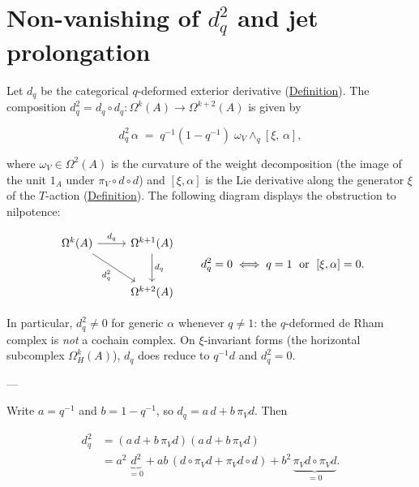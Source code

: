 \section{Non-vanishing of $d_q^2$ and jet prolongation}
\label{sec:dq-squared}

\begin{proposition}
  \label{prop:categorical-dq-squared}
Let $d_q$ be the categorical $q$-deformed exterior derivative
(\hyperref[def:categorical-q-ext-deriv]{Definition}).  The composition
$d_q^2 = d_q \circ d_q \colon \Omega^k(A) \to \Omega^{k+2}(A)$ is
given by

\[
d_q^2\,\alpha
  \;=\; q^{-1}(1 - q^{-1})\;\omega_V \wedge_q [\xi,\, \alpha],
\]

where $\omega_V \in \Omega^2(A)$ is the curvature of the weight
decomposition (the image of the unit $1_A$ under
$\pi_V \circ d \circ d$) and $[\xi, \alpha]$ is the Lie derivative
along the generator $\xi$ of the $T$-action
(\hyperref[def:weight-decomposition]{Definition}).  The following diagram
displays the obstruction to nilpotence:

\begin{equation}\label{eq:dq-squared-cd}
\begin{tikzcd}[row sep=2.5em, column sep=2.5em]
  \Omega^k(A) \ar[r, "d_q"] \ar[dr, "d_q^2"']
  & \Omega^{k+1}(A) \ar[d, "d_q"] \\
  & \Omega^{k+2}(A)
\end{tikzcd}
\qquad
d_q^2 = 0 \;\Longleftrightarrow\;
q = 1 \;\text{ or }\; [\xi, \alpha] = 0.
\end{equation}

In particular, $d_q^2 \neq 0$ for generic $\alpha$ whenever
$q \neq 1$: the $q$-deformed de Rham complex is \emph{not} a cochain
complex.  On $\xi$-invariant forms (the horizontal subcomplex
$\Omega^k_H(A)$), $d_q$ does reduce to $q^{-1} d$ and $d_q^2 = 0$.

---

Write $a = q^{-1}$ and $b = 1 - q^{-1}$, so $d_q = a\,d + b\,\pi_V d$.
Then

\begin{align*}
  d_q^2
  &= (a\,d + b\,\pi_V d)(a\,d + b\,\pi_V d) \\
  &= a^2\,\underbrace{d^2}_{= 0}
     + ab\,(d \circ \pi_V d + \pi_V d \circ d)
     + b^2\,\underbrace{\pi_V d \circ \pi_V d}_{= 0}.
\end{align*}


\end{proposition}
